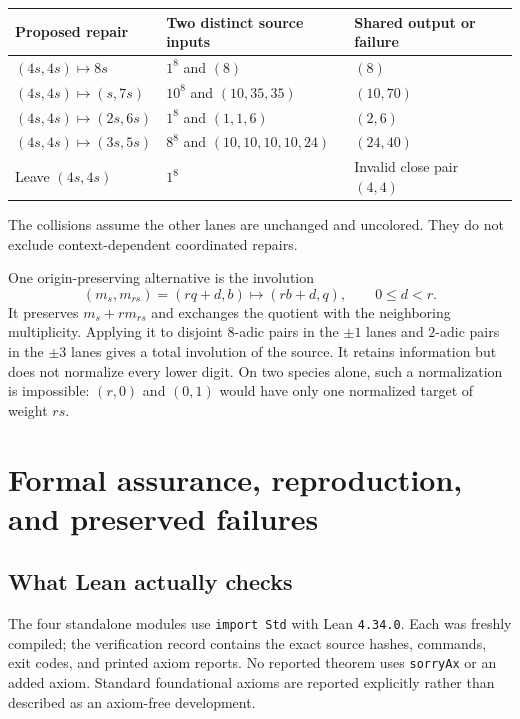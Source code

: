 \documentclass[11pt,a4paper]{article}
\theoremstyle{definition}
\begin{document}
\begin{center}
\begin{tabularx}{\linewidth}{lXX}
\toprule
Proposed repair&Two distinct source inputs&Shared output or failure\\\midrule
$(4s,4s)\mapsto8s$&$1^8$ and $(8)$&$(8)$\\
$(4s,4s)\mapsto(s,7s)$&$10^8$ and $(10,35,35)$&$(10,70)$\\
$(4s,4s)\mapsto(2s,6s)$&$1^8$ and $(1,1,6)$&$(2,6)$\\
$(4s,4s)\mapsto(3s,5s)$&$8^8$ and $(10,10,10,10,24)$&$(24,40)$\\
Leave $(4s,4s)$&$1^8$&Invalid close pair $(4,4)$\\\bottomrule
\end{tabularx}
\end{center}
The collisions assume the other lanes are unchanged and uncolored.
They do not exclude context-dependent coordinated repairs.

One origin-preserving alternative is the involution
\[
(m_s,m_{rs})=(rq+d,b)\longmapsto(rb+d,q),\qquad 0\le d<r.
\]
It preserves $m_s+rm_{rs}$ and exchanges the quotient with the neighboring
multiplicity. Applying it to disjoint $8$-adic pairs in the $\pm1$ lanes and
$2$-adic pairs in the $\pm3$ lanes gives a total involution of the source.
It retains information but does not normalize every lower digit. On two
species alone, such a normalization is impossible: $(r,0)$ and $(0,1)$
would have only one normalized target of weight $rs$.

\section{Formal assurance, reproduction, and preserved failures}

\subsection{What Lean actually checks}

The four standalone modules use \texttt{import Std} with Lean
\texttt{4.34.0}. Each was freshly compiled; the verification record contains
the exact source hashes, commands, exit codes, and printed axiom reports.
No reported theorem uses \texttt{sorryAx} or an added axiom.
Standard foundational axioms are reported explicitly rather than described
as an axiom-free development.
\end{document}
